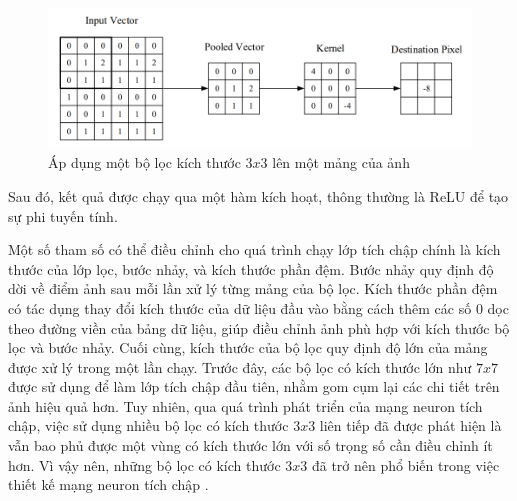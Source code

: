 \begin{figure}[H]
    \centering
    \includegraphics[scale=0.5]{pics/Chapter3/conv_kernel.png}
    \caption{Áp dụng một bộ lọc kích thước $3x3$ lên một mảng của ảnh \cite{o2015introduction}}
    \label{fig:enter-label}
\end{figure}

Sau đó, kết quả được chạy qua một hàm kích hoạt, thông thường là ReLU để tạo sự phi tuyến tính.

Một số tham số có thể điều chỉnh cho quá trình chạy lớp tích chập chính là kích thước của lớp lọc, bước nhảy, và kích thước phần đệm. Bước nhảy quy định độ dời về điểm ảnh sau mỗi lần xử lý từng mảng của bộ lọc. Kích thước phần đệm có tác dụng thay đổi kích thước của dữ liệu đầu vào bằng cách thêm các số 0 dọc theo đường viền của bảng dữ liệu, giúp điều chỉnh ảnh phù hợp với kích thước bộ lọc và bước nhảy. Cuối cùng, kích thước của bộ lọc quy định độ lớn của mảng được xử lý trong một lần chạy. Trước đây, các bộ lọc có kích thước lớn như $7x7$ được sử dụng để làm lớp tích chập đầu tiên, nhằm gom cụm lại các chi tiết trên ảnh hiệu quả hơn. Tuy nhiên, qua quá trình phát triển của mạng neuron tích chập, việc sử dụng nhiều bộ lọc có kích thước $3x3$ liên tiếp đã được phát hiện là vẫn bao phủ được một vùng có kích thước lớn với số trọng số cần điều chỉnh ít hơn. Vì vậy nên, những bộ lọc có kích thước $3x3$ đã trở nên phổ biến trong việc thiết kế mạng neuron tích chập \cite{simonyan2015deep}.


